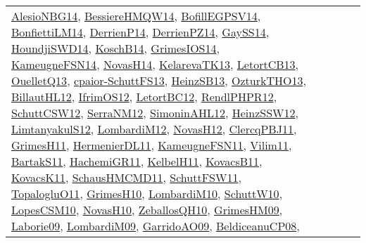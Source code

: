 {\begin{longtable}{llp{6cm}p{6cm}p{6cm}}
\href{papers/AlesioNBG14.pdf}{AlesioNBG14}\cite{AlesioNBG14}, \href{papers/BessiereHMQW14.pdf}{BessiereHMQW14}\cite{BessiereHMQW14}, \href{papers/BofillEGPSV14.pdf}{BofillEGPSV14}\cite{BofillEGPSV14}, \href{papers/BonfiettiLM14.pdf}{BonfiettiLM14}\cite{BonfiettiLM14}, \href{papers/DerrienP14.pdf}{DerrienP14}\cite{DerrienP14}, \href{papers/DerrienPZ14.pdf}{DerrienPZ14}\cite{DerrienPZ14}, \href{papers/GaySS14.pdf}{GaySS14}\cite{GaySS14}, \href{papers/HoundjiSWD14.pdf}{HoundjiSWD14}\cite{HoundjiSWD14}, \href{papers/KoschB14.pdf}{KoschB14}\cite{KoschB14}, \href{articles/GrimesIOS14.pdf}{GrimesIOS14}\cite{GrimesIOS14}, \href{articles/KameugneFSN14.pdf}{KameugneFSN14}\cite{KameugneFSN14}, \href{articles/NovasH14.pdf}{NovasH14}\cite{NovasH14}, \href{papers/KelarevaTK13.pdf}{KelarevaTK13}\cite{KelarevaTK13}, \href{papers/LetortCB13.pdf}{LetortCB13}\cite{LetortCB13}, \href{papers/OuelletQ13.pdf}{OuelletQ13}\cite{OuelletQ13}, \href{papers/cpaior-SchuttFS13.pdf}{cpaior-SchuttFS13}\cite{cpaior-SchuttFS13}, \href{articles/HeinzSB13.pdf}{HeinzSB13}\cite{HeinzSB13}, \href{articles/OzturkTHO13.pdf}{OzturkTHO13}\cite{OzturkTHO13}, \href{papers/BillautHL12.pdf}{BillautHL12}\cite{BillautHL12}, \href{papers/IfrimOS12.pdf}{IfrimOS12}\cite{IfrimOS12}, \href{papers/LetortBC12.pdf}{LetortBC12}\cite{LetortBC12}, \href{papers/RendlPHPR12.pdf}{RendlPHPR12}\cite{RendlPHPR12}, \href{papers/SchuttCSW12.pdf}{SchuttCSW12}\cite{SchuttCSW12}, \href{papers/SerraNM12.pdf}{SerraNM12}\cite{SerraNM12}, \href{papers/SimoninAHL12.pdf}{SimoninAHL12}\cite{SimoninAHL12}, \href{articles/HeinzSSW12.pdf}{HeinzSSW12}\cite{HeinzSSW12}, \href{articles/LimtanyakulS12.pdf}{LimtanyakulS12}\cite{LimtanyakulS12}, \href{articles/LombardiM12.pdf}{LombardiM12}\cite{LombardiM12}, \href{articles/NovasH12.pdf}{NovasH12}\cite{NovasH12}, \href{papers/ClercqPBJ11.pdf}{ClercqPBJ11}\cite{ClercqPBJ11}, \href{papers/GrimesH11.pdf}{GrimesH11}\cite{GrimesH11}, \href{papers/HermenierDL11.pdf}{HermenierDL11}\cite{HermenierDL11}, \href{papers/KameugneFSN11.pdf}{KameugneFSN11}\cite{KameugneFSN11}, \href{papers/Vilim11.pdf}{Vilim11}\cite{Vilim11}, \href{articles/BartakS11.pdf}{BartakS11}\cite{BartakS11}, \href{articles/HachemiGR11.pdf}{HachemiGR11}\cite{HachemiGR11}, \href{articles/KelbelH11.pdf}{KelbelH11}\cite{KelbelH11}, \href{articles/KovacsB11.pdf}{KovacsB11}\cite{KovacsB11}, \href{articles/KovacsK11.pdf}{KovacsK11}\cite{KovacsK11}, \href{articles/SchausHMCMD11.pdf}{SchausHMCMD11}\cite{SchausHMCMD11}, \href{articles/SchuttFSW11.pdf}{SchuttFSW11}\cite{SchuttFSW11}, \href{articles/TopalogluO11.pdf}{TopalogluO11}\cite{TopalogluO11}, \href{papers/GrimesH10.pdf}{GrimesH10}\cite{GrimesH10}, \href{papers/LombardiM10.pdf}{LombardiM10}\cite{LombardiM10}, \href{papers/SchuttW10.pdf}{SchuttW10}\cite{SchuttW10}, \href{articles/LopesCSM10.pdf}{LopesCSM10}\cite{LopesCSM10}, \href{articles/NovasH10.pdf}{NovasH10}\cite{NovasH10}, \href{articles/ZeballosQH10.pdf}{ZeballosQH10}\cite{ZeballosQH10}, \href{papers/GrimesHM09.pdf}{GrimesHM09}\cite{GrimesHM09}, \href{papers/Laborie09.pdf}{Laborie09}\cite{Laborie09}, \href{papers/LombardiM09.pdf}{LombardiM09}\cite{LombardiM09}, \href{articles/GarridoAO09.pdf}{GarridoAO09}\cite{GarridoAO09}, \href{papers/BeldiceanuCP08.pdf}{BeldiceanuCP08}\cite{BeldiceanuCP08}, 
\end{longtable}}
